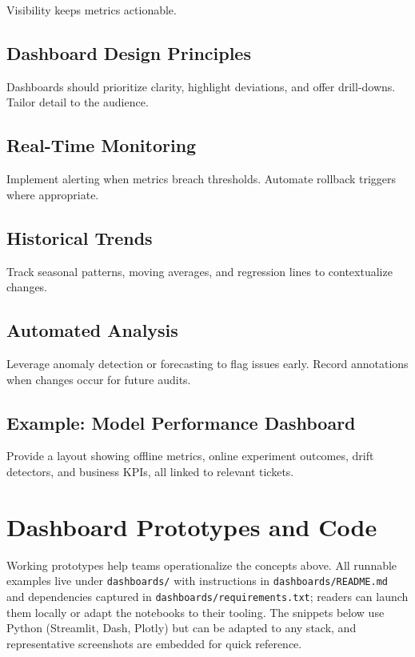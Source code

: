 Visibility keeps metrics actionable.

\subsection{Dashboard Design Principles}
Dashboards should prioritize clarity, highlight deviations, and offer drill-downs. Tailor detail to the audience.

\subsection{Real-Time Monitoring}
Implement alerting when metrics breach thresholds. Automate rollback triggers where appropriate.

\subsection{Historical Trends}
Track seasonal patterns, moving averages, and regression lines to contextualize changes.

\subsection{Automated Analysis}
Leverage anomaly detection or forecasting to flag issues early. Record annotations when changes occur for future audits.

\subsection{Example: Model Performance Dashboard}
Provide a layout showing offline metrics, online experiment outcomes, drift detectors, and business KPIs, all linked to relevant tickets.

\section{Dashboard Prototypes and Code}
\label{sec:metrics-dashboard-prototypes}

Working prototypes help teams operationalize the concepts above. All runnable examples live under \texttt{dashboards/} with instructions in \texttt{dashboards/README.md} and dependencies captured in \texttt{dashboards/requirements.txt}; readers can launch them locally or adapt the notebooks to their tooling. The snippets below use Python (Streamlit, Dash, Plotly) but can be adapted to any stack, and representative screenshots are embedded for quick reference.

